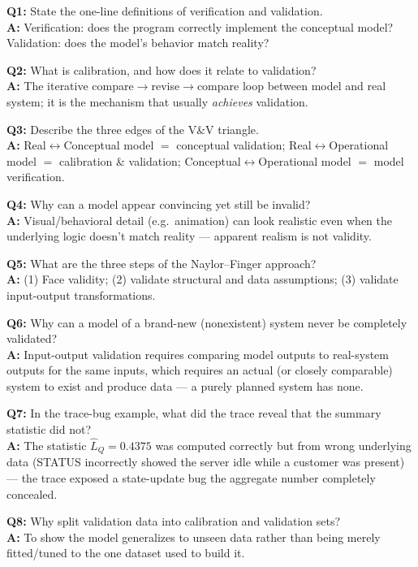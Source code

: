 \begin{qabox}
\textbf{Q1:} State the one-line definitions of verification and validation. \\
\textbf{A:} Verification: does the program correctly implement the conceptual model? Validation: does the model's behavior match reality?

\textbf{Q2:} What is calibration, and how does it relate to validation? \\
\textbf{A:} The iterative compare$\to$revise$\to$compare loop between model and real system; it is the mechanism that usually \emph{achieves} validation.

\textbf{Q3:} Describe the three edges of the V\&V triangle. \\
\textbf{A:} Real$\leftrightarrow$Conceptual model $=$ conceptual validation; Real$\leftrightarrow$Operational model $=$ calibration \& validation; Conceptual$\leftrightarrow$Operational model $=$ model verification.

\textbf{Q4:} Why can a model appear convincing yet still be invalid? \\
\textbf{A:} Visual/behavioral detail (e.g.\ animation) can look realistic even when the underlying logic doesn't match reality — apparent realism is not validity.

\textbf{Q5:} What are the three steps of the Naylor--Finger approach? \\
\textbf{A:} (1) Face validity; (2) validate structural and data assumptions; (3) validate input-output transformations.

\textbf{Q6:} Why can a model of a brand-new (nonexistent) system never be completely validated? \\
\textbf{A:} Input-output validation requires comparing model outputs to real-system outputs for the same inputs, which requires an actual (or closely comparable) system to exist and produce data — a purely planned system has none.

\textbf{Q7:} In the trace-bug example, what did the trace reveal that the summary statistic did not? \\
\textbf{A:} The statistic $\hat L_Q=0.4375$ was computed correctly but from wrong underlying data (STATUS incorrectly showed the server idle while a customer was present) — the trace exposed a state-update bug the aggregate number completely concealed.

\textbf{Q8:} Why split validation data into calibration and validation sets? \\
\textbf{A:} To show the model generalizes to unseen data rather than being merely fitted/tuned to the one dataset used to build it.
\end{qabox}
